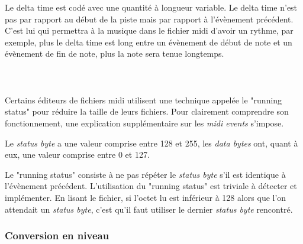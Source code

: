 Le delta time est codé avec une quantité à longueur variable. Le delta time n'est pas par rapport au début de la piste mais par rapport à l'évènement précédent. C'est lui qui permettra à la musique dans le fichier midi d'avoir un rythme, par exemple, plus le delta time est long entre un évènement de début de note et un évènement de fin de note, plus la note sera tenue longtemps.\\\\

\\\\

Certains éditeurs de fichiers midi utilisent une technique appelée le "running status" pour réduire la taille de leurs fichiers. Pour clairement comprendre son fonctionnement, une explication supplémentaire sur les \textit{midi events} s'impose.

Le \textit{status byte} a une valeur comprise entre 128 et 255, les \textit{data bytes} ont, quant à eux, une valeur comprise entre 0 et 127.

Le "running status" consiste à ne pas répéter le \textit{status byte} s'il est identique à l'évènement précédent. L'utilisation du "running status" est triviale à détecter et implémenter. En lisant le fichier, si l'octet lu est inférieur à 128 alors que l'on attendait un \textit{status byte}, c'est qu'il faut utiliser le dernier \textit{status byte} rencontré.

\subsubsection{Conversion en niveau}

